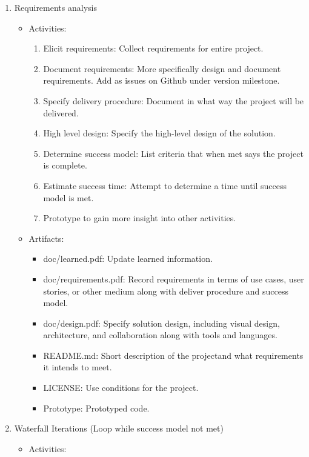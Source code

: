 \documentclass{article}
\begin{document}
\begin{enumerate}
	\item Requirements analysis \begin{itemize}
		\item Activities: \begin{enumerate}
			\item Elicit requirements: Collect requirements for
				entire project.
			\item Document requirements: More specifically design
				and document requirements. Add as issues on
				Github under version milestone.
			\item Specify delivery procedure: Document in what way
				the project will be delivered.
			\item High level design: Specify the high-level design
				of the solution.
			\item Determine success model: List criteria that when
				met says the project is complete.
			\item Estimate success time: Attempt to determine a time
				until success model is met.
			\item Prototype to gain more insight into other
				activities.
		\end{enumerate}
			\item Artifacts: \begin{itemize}
				\item doc/learned.pdf: Update learned
					information.
				\item doc/requirements.pdf: Record
					requirements in terms of use cases, user
					stories, or other medium along with
					deliver procedure and success model.
				\item doc/design.pdf: Specify solution design,
					including visual design, architecture,
					and collaboration along with tools and
					languages.
				\item README.md: Short description of the
					projectand what requirements it intends
					to meet.
				\item LICENSE: Use conditions for the project.
				\item Prototype: Prototyped code.
			\end{itemize}
		\end{itemize}
	\item Waterfall Iterations (Loop while success model not met)
		\begin{itemize}
			\item Activities: \begin{enumerate}

\end{enumerate}
\end{itemize}
\end{enumerate}
\end{document}
